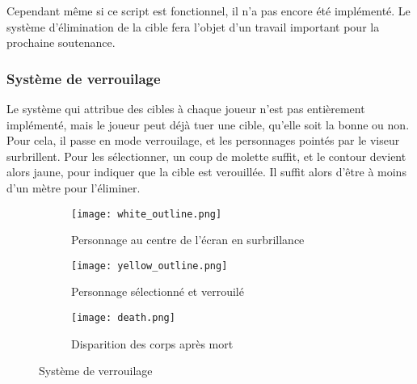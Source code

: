             Cependant même si ce script est fonctionnel, il n'a pas encore été implémenté. 
            Le système d'élimination de la cible fera l'objet d'un travail important pour la prochaine soutenance.
        
        
        \subsubsection{Système de verrouilage}
            
            Le système qui attribue des cibles à chaque joueur n'est pas entièrement implémenté, mais le joueur peut déjà tuer une cible, qu'elle soit la bonne ou non.
            Pour cela, il passe en mode verrouilage, et les personnages pointés par le viseur surbrillent.
            Pour les sélectionner, un coup de molette suffit, et le contour devient alors jaune, pour indiquer que la cible est verouillée.
            Il suffit alors d'être à moins d'un mètre pour l'éliminer.

            \begin{figure}[hbt!]
                \centering
                \begin{subfigure}[b]{0.3\textwidth}
                    \texttt{[image: white\_outline.png]} 
                    \caption{Personnage au centre de l'écran en surbrillance}
                \end{subfigure}
                \hspace{150pt}
                \begin{subfigure}[b]{0.3\textwidth}
                    \texttt{[image: yellow\_outline.png]} 
                    \caption{Personnage sélectionné et verrouilé}
                \end{subfigure}

                \begin{subfigure}[b]{0.3\textwidth}
                    \texttt{[image: death.png]} 
                    \caption{Disparition des corps après mort}
                \end{subfigure}
                \caption{Système de verrouilage}
            \end{figure}
            